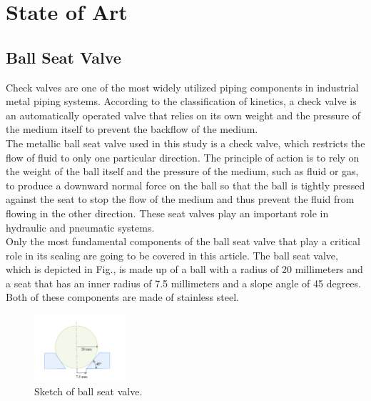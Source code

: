 \chapter{State of Art}
\label{ch:State of Art}

\section{Ball Seat Valve}
\label{Ball Seat Valve}

Check valves are one of the most widely utilized piping components in industrial metal piping systems. 
According to the classification of kinetics, a check valve is an automatically operated valve that
relies on its own weight and the pressure of the medium itself to prevent the backflow 
of the medium.\cite{kineticsValve}\\

The metallic ball seat valve used in this study is a check valve, which restricts the flow of fluid to
only one particular direction. The principle of action is to rely on the weight of the ball itself and 
the pressure of the medium, such as fluid or gas, to produce a downward normal force on the ball 
so that the ball is tightly pressed against the seat to stop the flow of the medium and thus prevent 
the fluid from flowing in the other direction. These seat valves play an important 
role in hydraulic and pneumatic systems.\\


Only the most fundamental components of the ball seat valve that play a critical role in its sealing 
are going to be covered in this article. The ball seat valve, which is depicted in Fig., is made 
up of a ball with a radius of 20 millimeters and a seat that has an inner radius 
of 7.5 millimeters and a slope angle of 45 degrees. Both of these components are made of stainless steel.\\

\begin{figure}[htbp]
    \centering
    \includegraphics[width=0.3\textwidth]{figures/BallSeatValve/ballseatvalve.jpg}
    \caption{Sketch of ball seat valve.}
    \label{fig:ballseatvalve}
\end{figure}


